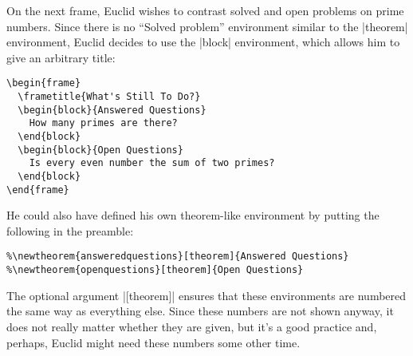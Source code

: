 On the next frame, Euclid wishes to contrast solved and open problems
on prime numbers. Since there is no ``Solved problem'' environment
similar to the |theorem| environment, Euclid decides to use the
|block| environment, which allows him to give an arbitrary title:
\begin{verbatim}
\begin{frame}
  \frametitle{What's Still To Do?}
  \begin{block}{Answered Questions}
    How many primes are there?
  \end{block}
  \begin{block}{Open Questions}
    Is every even number the sum of two primes?
  \end{block}
\end{frame}
\end{verbatim}
He could also have defined his own theorem-like environment by putting
the following in the preamble:
\begin{verbatim}
%\newtheorem{answeredquestions}[theorem]{Answered Questions}
%\newtheorem{openquestions}[theorem]{Open Questions}
\end{verbatim}
The optional argument |[theorem]| ensures that these environments are
numbered the same way as everything else. Since these numbers are not
shown anyway, it does not really matter whether they are given, but
it's a good practice and, perhaps, Euclid might need these numbers
some other time.


